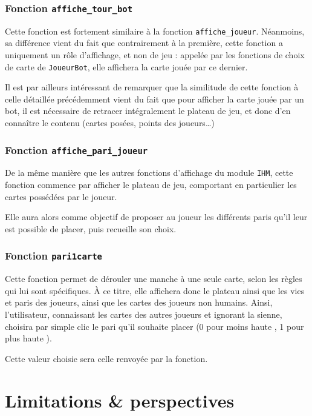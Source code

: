       \subsubsection{Fonction \texttt{affiche\_tour\_bot}}
         Cette fonction est fortement similaire à la fonction \texttt{affiche\_joueur}.
         Néanmoins, sa différence vient du fait que contrairement à la première, cette fonction a uniquement un rôle d'affichage, et non de jeu : appelée par les fonctions de choix de carte de \texttt{JoueurBot}, elle affichera la carte jouée par ce dernier.

         Il est par ailleurs intéressant de remarquer que la similitude de cette fonction à celle détaillée précédemment vient du fait que pour afficher la carte jouée par un bot, il est nécessaire de retracer intégralement le plateau de jeu, et donc d'en connaître le contenu (cartes posées, points des joueurs\dots)

      \subsubsection{Fonction \texttt{affiche\_pari\_joueur}}
         De la même manière que les autres fonctions d'affichage du module \texttt{IHM}, cette fonction commence par afficher le plateau de jeu, comportant en particulier les cartes possédées par le joueur.

         Elle aura alors comme objectif de proposer au joueur les différents paris qu'il leur est possible de placer, puis recueille son choix.
         
      \subsubsection{Fonction \texttt{pari1carte}}
         Cette fonction permet de dérouler une manche à une seule carte, selon les règles qui lui sont spécifiques.
         À ce titre, elle affichera donc le plateau ainsi que les vies et paris des joueurs, ainsi que les cartes des joueurs non humains.
         Ainsi, l'utilisateur, connaissant les cartes des autres joueurs et ignorant la sienne, choisira par simple clic le pari qu'il souhaite placer (0 pour \og moins haute \fg{}, 1 pour \og plus haute \fg{}).

         Cette valeur choisie sera celle renvoyée par la fonction.



\section{Limitations \& perspectives}\label{sec:limitations-observées-et-perspectives}

